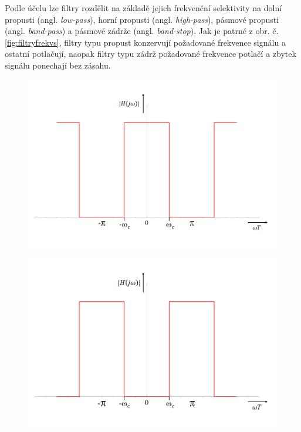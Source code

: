 \documentclass[a4paper, 12pt]{article}
\begin{document}
Podle účelu lze filtry rozdělit na základě jejich frekvenční selektivity na dolní propusti (angl. \textit{low-pass}), horní propusti (angl. \textit{high-pass}), pásmové propusti (angl. \textit{band-pass}) a pásmové zádrže (angl. \textit{band-stop}). Jak je patrné z obr. č.\ref{fig:filtryfrekvs}, filtry typu propust konzervují požadované frekvence signálu a ostatní potlačují, naopak filtry typu zádrž požadované frekvence potlačí a zbytek signálu ponechají bez zásahu.

\begin{figure}[hbt!]
\centering
\begin{minipage}[b]{6.5cm}
  \centering
  \includegraphics[width=\linewidth]{lowpass.png}\\
\end{minipage}\hspace{0.5cm}
\begin{minipage}[b]{6.5cm}
  \centering
  \includegraphics[width=\linewidth]{highpass.png}\\

\end{minipage}
\end{figure}
\end{document}
